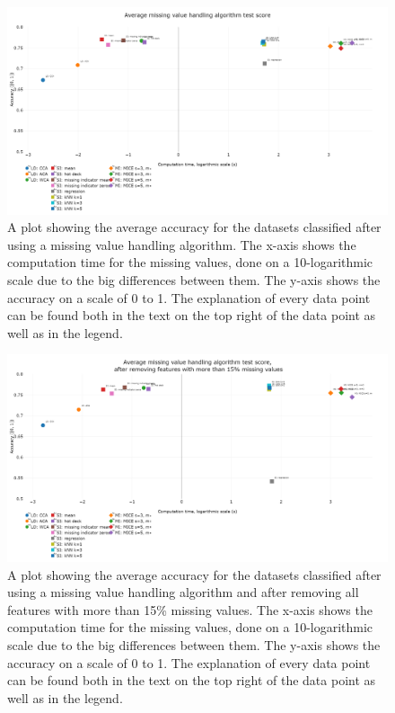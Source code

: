 \documentclass[10pt,a4paper]{report}
\begin{document}
	\begin{figure}[H]
		\centering
		\includegraphics[angle=90,height=0.9\textheight]{avg_acc.PNG}
		\caption{A plot showing the average accuracy for the datasets classified after using a missing value handling algorithm. The x-axis shows the computation time for the missing values, done on a 10-logarithmic scale due to the big differences between them. The y-axis shows the accuracy on a scale of 0 to 1. The explanation of every data point can be found both in the text on the top right of the data point as well as in the legend.}
		\label{fig:EvalAvgAcc}
	\end{figure}
	
	\begin{figure}[H]
		\centering
		\includegraphics[angle=90,height=0.9\textheight]{avg_acc_15aca.PNG}
		\caption{A plot showing the average accuracy for the datasets classified after using a missing value handling algorithm and after removing all features with more than 15\% missing values. The x-axis shows the computation time for the missing values, done on a 10-logarithmic scale due to the big differences between them. The y-axis shows the accuracy on a scale of 0 to 1. The explanation of every data point can be found both in the text on the top right of the data point as well as in the legend.}
		\label{fig:EvalAvgAccExtraACA}
	\end{figure}
	
\end{document}
